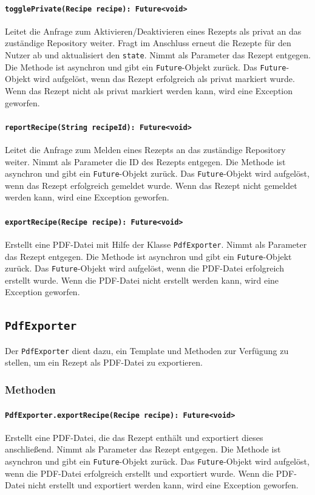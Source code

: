 \documentclass{entwurfsheft}
\begin{document}
\paragraph{\texttt{togglePrivate(Recipe recipe): Future<void>}}
Leitet die Anfrage zum Aktivieren/Deak\-ti\-vieren eines Rezepts als privat an das zuständige Repository weiter. Fragt im Anschluss erneut die Rezepte für den Nutzer ab und aktualisiert den \texttt{state}. Nimmt als Parameter das Rezept entgegen. Die Methode ist asynchron und gibt ein \texttt{Future}-Objekt zurück. Das \texttt{Future}-Objekt wird aufgelöst, wenn das Rezept erfolgreich als privat markiert wurde. Wenn das Rezept nicht als privat markiert werden kann, wird eine Exception geworfen.
\paragraph{\texttt{reportRecipe(String recipeId): Future<void>}}
Leitet die Anfrage zum Melden eines Rezepts an das zuständige Repository weiter. Nimmt als Parameter die ID des Rezepts entgegen. Die Methode ist asynchron und gibt ein \texttt{Future}-Objekt zurück. Das \texttt{Future}-Objekt wird aufgelöst, wenn das Rezept erfolgreich gemeldet wurde. Wenn das Rezept nicht gemeldet werden kann, wird eine Exception geworfen.
\paragraph{\texttt{exportRecipe(Recipe recipe): Future<void>}}
Erstellt eine PDF-Datei mit Hilfe der Klasse \texttt{PdfExporter}. Nimmt als Parameter das Rezept entgegen. Die Methode ist asynchron und gibt ein \texttt{Future}-Objekt zurück. Das \texttt{Future}-Objekt wird aufgelöst, wenn die PDF-Datei erfolgreich erstellt wurde. Wenn die PDF-Datei nicht erstellt werden kann, wird eine Exception geworfen.

\newpage
\subsection{\texttt{PdfExporter}}\label{sec:PdfExporter}
Der \texttt{PdfExporter} dient dazu, ein Template und Methoden zur Verfügung zu stellen, um ein Rezept als PDF-Datei zu exportieren.
\subsubsection*{Methoden}
\paragraph{\texttt{PdfExporter.exportRecipe(Recipe recipe): Future<void>}}
Erstellt eine PDF-Datei, die das Rezept enthält und exportiert dieses anschließend. Nimmt als Parameter das Rezept entgegen. Die Methode ist asynchron und gibt ein \texttt{Future}-Objekt zurück. Das \texttt{Future}-Objekt wird aufgelöst, wenn die PDF-Datei erfolgreich erstellt und exportiert wurde. Wenn die PDF-Datei nicht erstellt und exportiert werden kann, wird eine Exception geworfen.
\newpage
\end{document}
